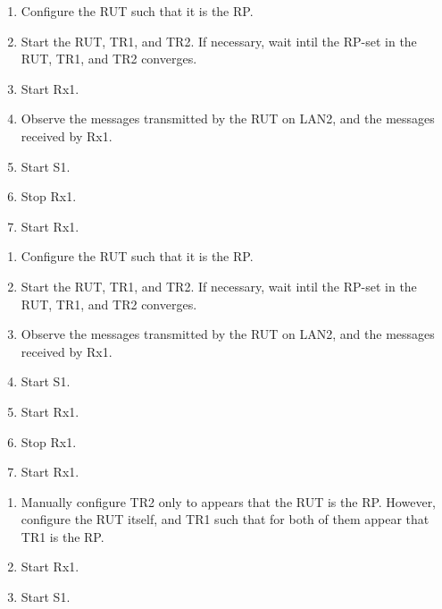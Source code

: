 \documentclass[11pt]{report}
\begin{document}


\begin{enumerate}

  \item Configure the RUT such that it is the RP.

  \item Start the RUT, TR1, and TR2. If necessary, wait intil the RP-set in
  the RUT, TR1, and TR2 converges.

  \item Start Rx1.

  \item Observe the messages transmitted by the RUT on LAN2, and the messages
  received by Rx1.

  \item Start S1.

  \item Stop Rx1.

  \item Start Rx1.

\end{enumerate}


\begin{enumerate}

  \item Configure the RUT such that it is the RP.

  \item Start the RUT, TR1, and TR2. If necessary, wait intil the RP-set in
  the RUT, TR1, and TR2 converges.

  \item Observe the messages transmitted by the RUT on LAN2, and the messages
  received by Rx1.

  \item Start S1.

  \item Start Rx1.

  \item Stop Rx1.

  \item Start Rx1.

\end{enumerate}


\begin{enumerate}

  \item Manually configure TR2 only to appears that the RUT is the
  RP. However, configure the RUT itself, and TR1 such that for both of them
  appear that TR1 is the RP.

  \item Start Rx1.

  \item Start S1.

\end{enumerate}
\end{document}
